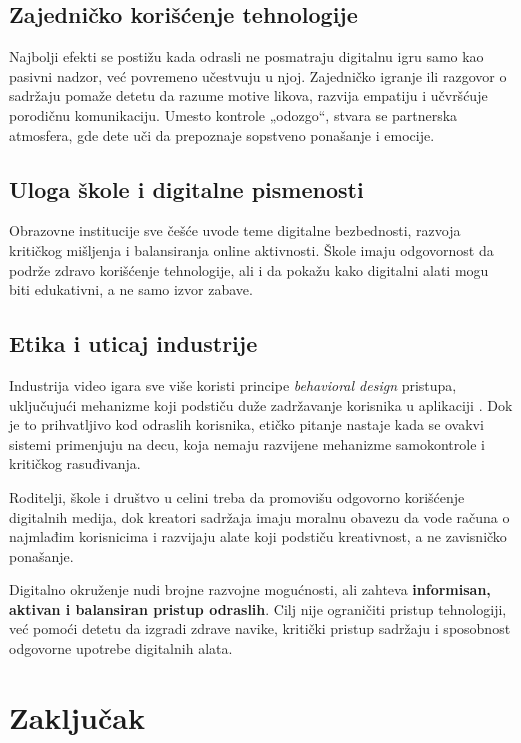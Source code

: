 \documentclass[a4paper,12pt]{article}
\begin{document}
\subsection*{Zajedničko korišćenje tehnologije}
Najbolji efekti se postižu kada odrasli ne posmatraju digitalnu igru samo kao pasivni nadzor, već povremeno učestvuju u njoj. 
Zajedničko igranje ili razgovor o sadržaju pomaže detetu da razume motive likova, razvija empatiju i učvršćuje porodičnu komunikaciju. 
Umesto kontrole „odozgo“, stvara se partnerska atmosfera, gde dete uči da prepoznaje sopstveno ponašanje i emocije.

\subsection*{Uloga škole i digitalne pismenosti}
Obrazovne institucije sve češće uvode teme digitalne bezbednosti, razvoja kritičkog mišljenja i balansiranja online aktivnosti. 
Škole imaju odgovornost da podrže zdravo korišćenje tehnologije, ali i da pokažu kako digitalni alati mogu biti edukativni, a ne samo izvor zabave.

\subsection*{Etika i uticaj industrije}
Industrija video igara sve više koristi principe \textit{behavioral design} pristupa, uključujući mehanizme koji podstiču duže zadržavanje korisnika u aplikaciji \cite{zagal2021dark}. 
Dok je to prihvatljivo kod odraslih korisnika, etičko pitanje nastaje kada se ovakvi sistemi primenjuju na decu, koja nemaju razvijene mehanizme samokontrole i kritičkog rasuđivanja.

Roditelji, škole i društvo u celini treba da promovišu odgovorno korišćenje digitalnih medija, dok kreatori sadržaja imaju moralnu obavezu da vode računa o najmlađim korisnicima i razvijaju alate koji podstiču kreativnost, a ne zavisničko ponašanje.

\bigskip

Digitalno okruženje nudi brojne razvojne mogućnosti, ali zahteva \textbf{informisan, aktivan i balansiran pristup odraslih}. 
Cilj nije ograničiti pristup tehnologiji, već pomoći detetu da izgradi zdrave navike, kritički pristup sadržaju i sposobnost odgovorne upotrebe digitalnih alata.


\section{Zaključak}
\end{document}
